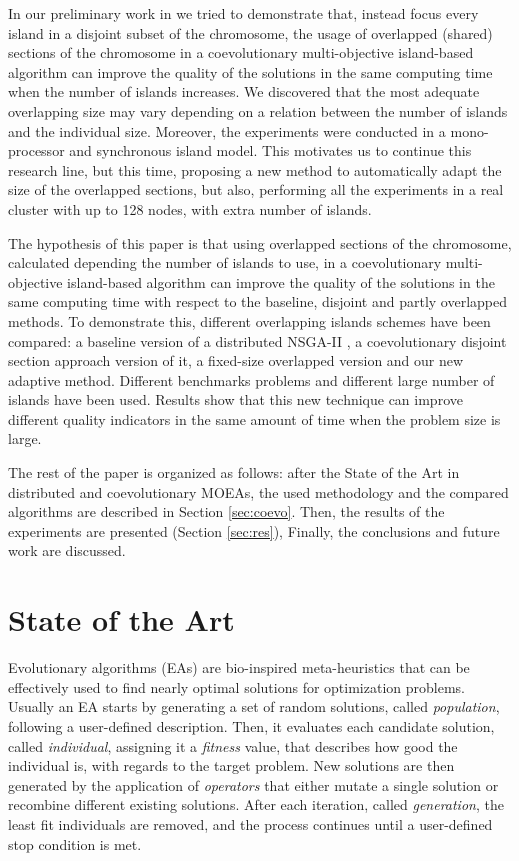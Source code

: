 \documentclass[preprint]{elsarticle}
\begin{document}
In our preliminary work in \citep{Garcia16hpmoon} we tried to demonstrate that, instead focus every island in a disjoint subset of the chromosome, the usage of overlapped (shared) sections of the chromosome in a coevolutionary multi-objective island-based algorithm can improve the quality of the solutions in the same computing time when the number of islands increases. We discovered that the most adequate overlapping size may vary depending on a relation between the number of islands and the individual size. Moreover, the experiments were conducted in a mono-processor and synchronous island model. This motivates us to continue this research line, but this time, proposing a new method to automatically adapt the size of the overlapped sections, but also, performing all the experiments in a real cluster with up to 128 nodes, with extra number of islands.


The hypothesis of this paper is that using overlapped sections of the chromosome, calculated depending the number of islands to use, in a coevolutionary multi-objective island-based algorithm can improve the quality of the solutions in the same computing time with respect to the baseline, disjoint and partly overlapped methods. To demonstrate this, different overlapping islands schemes have been compared: a baseline version of a distributed NSGA-II \citep{Deb00NSGAII}, a coevolutionary disjoint section approach version of it, a fixed-size overlapped version and our new adaptive method. Different benchmarks problems and different large number of islands have been used. Results show that this new technique can improve different quality indicators in the same amount of time when the problem size is large. 

The rest of the paper is organized as follows: after the State of the Art in distributed and coevolutionary MOEAs, 
the used methodology and the compared algorithms are described in Section \ref{sec:coevo}. 
Then, the results of the experiments are presented (Section \ref{sec:res}), Finally, the conclusions and future work are discussed.


%
\section{State of the Art}
\label{sec:soa}

Evolutionary algorithms (EAs) \citep{DBLP:series/ncs/EibenS15,DeJong2006} are bio-inspired meta-heuristics that can be effectively used to find nearly optimal solutions for optimization problems. Usually an EA starts by generating a set of random solutions, called \emph{population}, following a user-defined description. Then, it evaluates each candidate solution, called \emph{individual}, assigning it a \emph{fitness} value, that describes how good the individual is, with regards to the target problem. New solutions are then generated by the application of \emph{operators} that either mutate a single solution or recombine different existing solutions. After each iteration, called \emph{generation}, the least fit individuals are removed, and the process continues until a user-defined stop condition is met.
\end{document}
